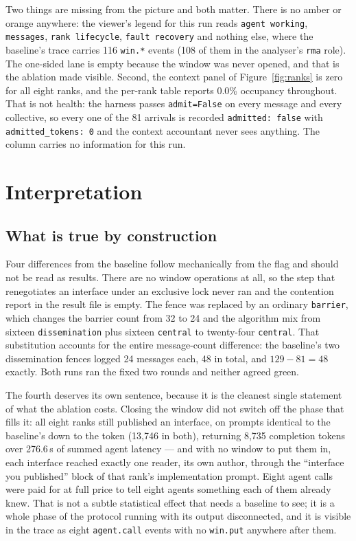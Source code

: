 \documentclass[11pt]{article}
\begin{document}
Two things are missing from the picture and both matter. There is no amber or orange anywhere:
the viewer's legend for this run reads \texttt{agent working}, \texttt{messages},
\texttt{rank lifecycle}, \texttt{fault recovery} and nothing else, where the baseline's trace
carries 116 \texttt{win.*} events (108 of them in the analyser's \texttt{rma} role). The
one-sided lane is empty because the window was never opened, and that is the ablation made
visible. Second, the context panel of Figure~\ref{fig:ranks} is zero for all eight ranks, and
the per-rank table reports 0.0\% occupancy throughout. That is not health: the harness passes
\texttt{admit=False} on every message and every collective, so every one of the 81 arrivals is
recorded \texttt{admitted: false} with \texttt{admitted\_tokens: 0} and the context accountant
never sees anything. The column carries no information for this run.

\section{Interpretation}

\subsection{What is true by construction}

Four differences from the baseline follow mechanically from the flag and should not be read as
results. There are no window operations at all, so the step that renegotiates an interface under
an exclusive lock never ran and the contention report in the result file is empty. The fence was
replaced
by an ordinary \texttt{barrier}, which changes the barrier count from 32 to 24 and the
algorithm mix from sixteen \texttt{dissemination} plus sixteen \texttt{central} to
twenty-four \texttt{central}. That substitution accounts for the entire message-count
difference: the baseline's two dissemination fences logged 24 messages each, 48 in total, and
$129-81=48$ exactly. Both runs ran the fixed two rounds and neither agreed green.

The fourth deserves its own sentence, because it is the cleanest single statement of what the
ablation costs. Closing the window did not switch off the phase that fills it: all eight ranks
still published an interface, on prompts identical to the baseline's down to the token
(13{,}746 in both), returning 8{,}735 completion tokens over 276.6\,s of summed agent latency ---
and with no window to put them in, each interface reached exactly one reader, its own author,
through the ``interface you published'' block of that rank's implementation prompt. Eight agent
calls were paid for at full price to tell eight agents something each of them already knew. That
is not a subtle statistical effect that needs a baseline to see; it is a whole phase of the
protocol running with its output disconnected, and it is visible in the trace as eight
\texttt{agent.call} events with no \texttt{win.put} anywhere after them.
\end{document}
